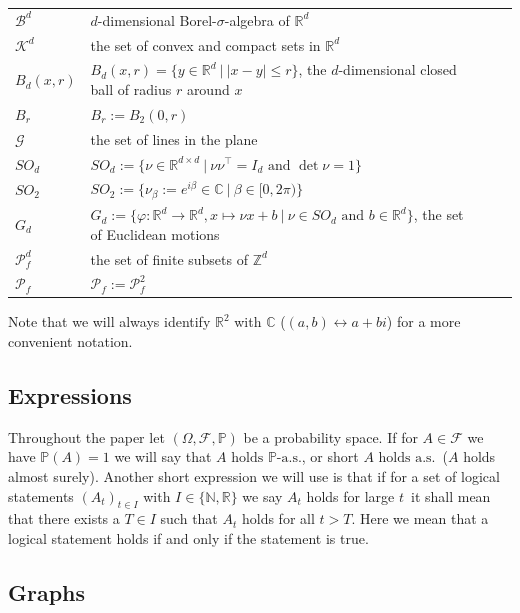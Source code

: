 \documentclass[12pt,a4paper]{scrartcl}
\newcommand{\C}{\mathbb{C}} %
\newcommand{\R}{\mathbb{R}} %
\newcommand{\Z}{\mathbb{Z}} %
\newcommand{\N}{\mathbb{N}} %
\newcommand{\K}{\mathcal{K}}
\newcommand{\1}{\mathbbm{1}}
\newcommand{\G}{\mathcal{G}}
\newcommand{\mP}{\mathcal{P}}
\theoremstyle{definition}
\numberwithin{equation}{section}
\begin{document}
\begin{longtable}{p{3.8cm}p{12.4cm}ll}
	$\mathcal{B}^d$ & $d$-dimensional Borel-$\sigma$-algebra of $\R^d$\\
	$\K^d$ & the set of convex and compact sets in $\R^d$\\
	$B_d(x,r)$ & $B_d(x,r) = \{y\in \R^d\ |\ |x-y| \leq r\}$, the $d$-dimensional closed ball of radius $r$ around $x$\\
	$B_r$ & $B_r := B_2(0,r)$\\
	$\G$ & the set of lines in the plane\\
	$SO_d$ & $SO_d := \{\nu \in \R^{d\times d}\ |\ \nu \nu^\top = I_d \text{ and } \det \nu = 1\}$\\
	$SO_2$ & $SO_2 := \{\nu_\beta := e^{i\beta} \in \C\ |\ \beta\in [0,2\pi)\}$\\
	$G_d$ & $G_d := \{\varphi: \R^d \to \R^d, x\mapsto \nu x+b\ |\ \nu \in SO_d\text{ and }b\in \R^d\}$, the set of Euclidean motions\\
	$\mP^d_f$ & the set of finite subsets of $\Z^d$\\
	$\mP_f$ & $\mP_f := \mP^2_f$
\end{longtable}

\noindent Note that we will always identify $\R^2$ with $\C$ ($(a,b)\leftrightarrow a+bi$) for a more convenient notation. 

\subsection{Expressions}

Throughout the paper let  $(\Omega,\mathcal{F}, \mathbb{P})$ be a probability space. If for $A\in \mathcal{F}$ we have $\mathbb{P}(A)=1$ we will say that \glqq $A \text{ holds }\mathbb{P}\text{-a.s.}$\grqq, or short \glqq$ A\text{ holds } \text{a.s.}$\grqq\ ($A$ holds almost surely). Another short expression we will use is that if for a set of logical statements $(A_t)_{t\in I}$ with $I\in\{\N,\R\}$ we say \glqq $A_t$ holds for large $t$\grqq\ it shall mean that there exists a $T\in I$ such that $A_t$ holds for all $t>T$. Here we mean that a logical statement holds if and only if the statement is true. 


\subsection{Graphs} \label{zgraph}
\end{document}
